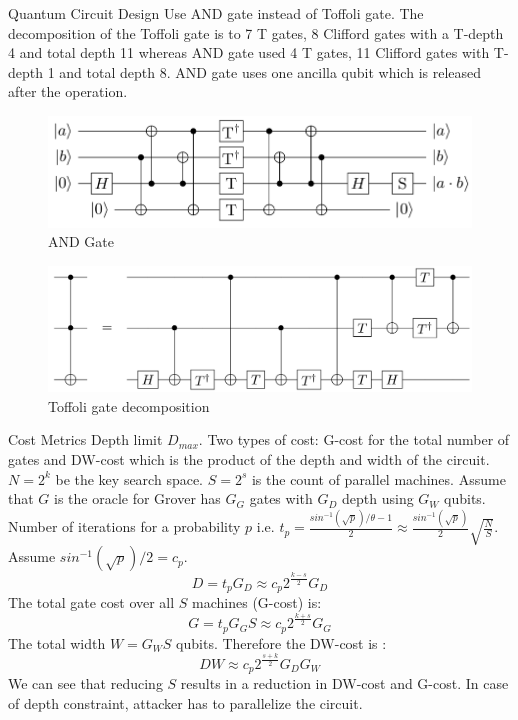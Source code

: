 \begin{frame}{Quantum Circuit Design}
    Use AND gate instead of Toffoli gate. \pause The decomposition of the Toffoli gate is to 7 T gates, 8 Clifford gates with a T-depth 4 and total depth 11 \pause whereas AND gate used 4 T gates, 11 Clifford gates with T-depth 1 and total depth 8. \pause AND gate uses one ancilla qubit which is released after the operation.
    \begin{figure}[h!]
    \centering
    \includegraphics[width=0.6\linewidth]{aes/and.png}
    \caption{AND Gate \cite{aeslowmc}}
    \label{fig:and}
\end{figure}

\begin{figure}[h!]
    \centering
    \includegraphics[width=0.6\linewidth]{aes/toffoli.png}
    \caption{Toffoli gate decomposition\cite{wiki:toff}}
    \label{fig:toff}
\end{figure}
\end{frame}
\begin{frame}{Cost Metrics}
    Depth limit $D_{max}$. \pause Two types of cost: G-cost for the total number of gates \pause and DW-cost which is the product of the depth and width of the circuit. \pause $N = 2^k$ be the key search space. \pause $S = 2^s$ is the count of parallel machines. \pause Assume that $G$ is the oracle for Grover has $G_G$ gates with $G_D$ depth using $G_W$ qubits. \pause Number of iterations for a probability $p$ i.e. $t_p = \frac{sin^{-1}(\sqrt{p})/\theta - 1}{2} \approx \frac{sin^{-1}(\sqrt{p})}{2}\sqrt{\frac{N}{S}}$. \pause Assume $sin^{-1}(\sqrt{p})/2 = c_p$.
    \pause
    \begin{equation}\label{eq:D}
    D = t_pG_D \approx c_p2^{\frac{k-s}{2}}G_D
\end{equation}
The total gate cost over all $S$ machines (G-cost) is: \pause
\begin{equation}\label{eq:gcost}
    G = t_pG_GS \approx c_p2^{\frac{k+s}{2}}G_G
\end{equation}
The total width $W = G_WS$ qubits. Therefore the DW-cost is : \pause
\begin{equation}\label{eq:DW}
    DW \approx c_p2^{\frac{s+k}{2}}G_DG_W
\end{equation}
\pause
We can see that reducing $S$ results in a reduction in DW-cost and G-cost. In case of depth constraint, attacker has to parallelize the circuit.
\end{frame}
